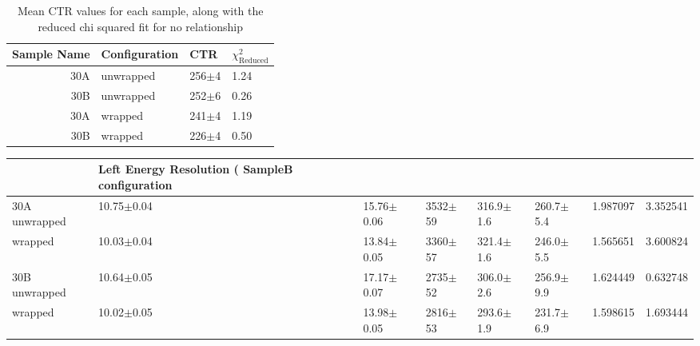 \begin{table}
\caption{\label{tab:doiresults} Mean CTR values for each sample, along with the reduced chi squared fit for no relationship}
\begin{tabular}{rlll}
\hline
Sample Name & Configuration & CTR &  $\chi^2_\text{Reduced}$ \\
\hline
        30A &     unwrapped &  256$\pm$4 &                    1.24 \\
        30B &     unwrapped &  252$\pm$6 &                    0.26 \\
        30A &       wrapped &  241$\pm$4 &                    1.19 \\
        30B &       wrapped &  226$\pm$4 &                    0.50 \\
\hline
\end{tabular}
\end{table}

\begin{tabular}{llllllrr}
\hline
{} & Left Energy Resolution (%
SampleB configuration &                      &                  &              &                &                &             &                        \\
\hline
30A     unwrapped     &       10.75$\pm$0.04 &   15.76$\pm$0.06 &  3532$\pm$59 &  316.9$\pm$1.6 &  260.7$\pm$5.4 &    1.987097 &               3.352541 \\
        wrapped       &       10.03$\pm$0.04 &   13.84$\pm$0.05 &  3360$\pm$57 &  321.4$\pm$1.6 &  246.0$\pm$5.5 &    1.565651 &               3.600824 \\
30B     unwrapped     &       10.64$\pm$0.05 &   17.17$\pm$0.07 &  2735$\pm$52 &  306.0$\pm$2.6 &  256.9$\pm$9.9 &    1.624449 &               0.632748 \\
        wrapped       &       10.02$\pm$0.05 &   13.98$\pm$0.05 &  2816$\pm$53 &  293.6$\pm$1.9 &  231.7$\pm$6.9 &    1.598615 &               1.693444 \\
\hline
\end{tabular}